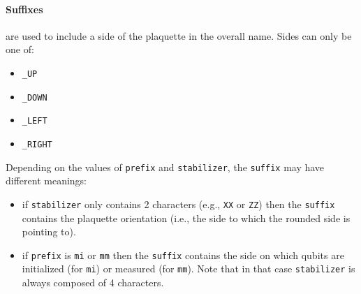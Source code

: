 \documentclass{article}
\begin{document}
\paragraph{Suffixes} are used to include a side of the plaquette in the overall name. Sides can
only be one of:

\begin{itemize}
\item \texttt{_UP}
\item \texttt{_DOWN}
\item \texttt{_LEFT}
\item \texttt{_RIGHT}
\end{itemize}

Depending on the values of \texttt{prefix} and \texttt{stabilizer}, the \texttt{suffix} 
may have different meanings:

\begin{itemize}
\item if \texttt{stabilizer} only contains 2 characters (e.g., \texttt{XX} or \texttt{ZZ})
    then the \texttt{suffix} contains the plaquette orientation (i.e., the side to which
    the rounded side is pointing to).
\item if \texttt{prefix} is \texttt{mi} or \texttt{mm} then the \texttt{suffix} contains the
    side on which qubits are initialized (for \texttt{mi}) or measured (for \texttt{mm}).
    Note that in that case \texttt{stabilizer} is always composed of 4 characters.
\end{itemize}
\end{document}
